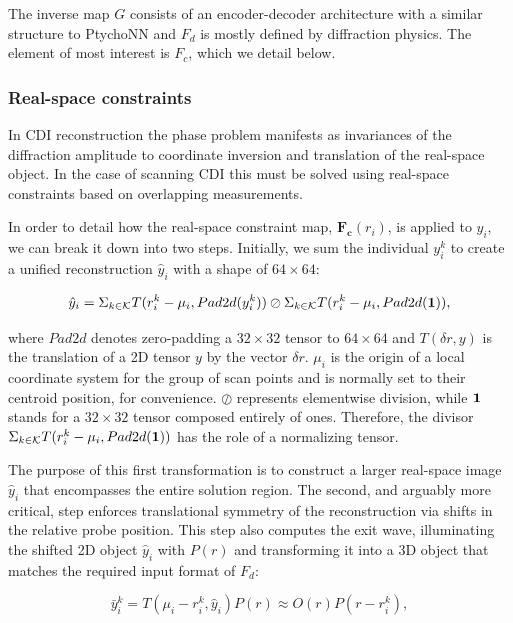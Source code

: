 \documentclass[sn-mathphys]{sn-jnl}%
\theoremstyle{thmstyleone}%
\theoremstyle{thmstyletwo}%
\theoremstyle{thmstylethree}%
\begin{document}
The inverse map $G$ consists of an encoder-decoder architecture with a similar structure to PtychoNN and $F_d$ is mostly defined by diffraction physics. The element of most interest is $F_c$, which we detail below.


\subsubsection{Real-space constraints}
In CDI reconstruction the phase problem manifests as invariances of the diffraction amplitude to coordinate inversion and translation of the real-space object. In the case of scanning CDI this must be solved using real-space constraints based on overlapping measurements.

In order to detail how the real-space constraint map, $\mathbf{F_c}(r_i)$, is applied to $y_i$, we can break it down into two steps. Initially, we sum the individual $y_i^k$ to create a unified reconstruction $\hat{y}_i$ with a shape of $64 \times 64$:


\begin{equation} 
\hat{y}_i = \Sigma_{k \in \mathcal{K}} T(r_i^k - \mu_i, Pad2d(y_i^k))
\oslash
\Sigma_{k \in \mathcal{K}} T(r_i^k - \mu_i, Pad2d(\bf{1})), 
\label{eq:1}
\end{equation}

where $Pad2d$ denotes zero-padding a $32 \times 32$ tensor to $64 \times 64$ and $T(\delta r, y)$ is the translation of a 2D tensor $y$ by the vector $\delta r$. $\mu_i$ is the origin of a local coordinate system for the group of scan points and is normally set to their centroid position, for convenience. $\oslash$ represents elementwise division, while $\bf{1}$ stands for a $32 \times 32$ tensor composed entirely of ones. Therefore, the divisor $\Sigma_{k \in \mathcal{K}} T(r_i^k - \mu_i, Pad2d(\bf{1}))$ has the role of a normalizing tensor.

The purpose of this first transformation is to construct a larger real-space image $\hat{y}_i$ that encompasses the entire solution region. The second, and arguably more critical, step enforces translational symmetry of the reconstruction via shifts in the relative probe position. This step also computes the exit wave, illuminating the shifted 2D object $\hat{y}_i$ with $P(r)$ and transforming it into a 3D object that matches the required input format of $F_d$:

\begin{equation}
\bar{y}_i^k = T(\mu_i - r_i^k, \hat{y}_i) P(r) \approx O(r) P(r - r_i^k),
\label{eq:2}
\end{equation}
\end{document}
